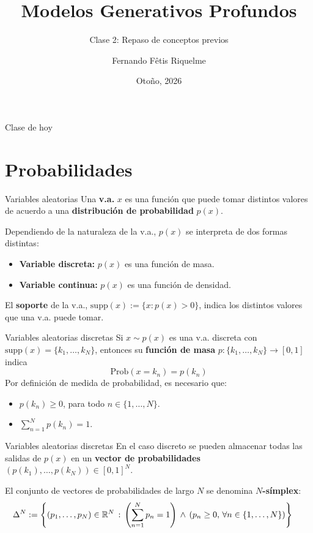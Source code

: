 \documentclass{beamer}
\title{Modelos Generativos Profundos}
\subtitle{Clase 2: Repaso de conceptos previos}
\author{Fernando Fêtis Riquelme}
\institute{
    Facultad de Ciencias Físicas y Matemáticas\\
    Universidad de Chile
}
\date{Otoño, 2026}
\newcommand{\R}{\mathbb{R}}
\begin{document}
\begin{frame}
    \titlepage
\end{frame}

\begin{frame}{Clase de hoy}
    \tableofcontents
\end{frame}

\section{Probabilidades}

\begin{frame}{Variables aleatorias}
    Una \textbf{v.a.} $x$ es una función que puede tomar distintos valores de acuerdo a una \textbf{distribución de probabilidad} $p(x)$.

    Dependiendo de la naturaleza de la v.a., $p(x)$ se interpreta de dos formas distintas:
    \begin{itemize}
        \item \textbf{Variable discreta:} $p(x)$ es una función de masa.
        \item \textbf{Variable continua:} $p(x)$ es una función de densidad.
    \end{itemize}
    El \textbf{soporte} de la v.a., $\text{supp}(x):=\{x:p(x)>0\}$, indica los distintos valores que una v.a. puede tomar.
\end{frame}

\begin{frame}{Variables aleatorias discretas}
    Si $x\sim p(x)$ es una v.a. discreta con $\text{supp}(x)=\{k_1,\ldots,k_N\}$, entonces su \textbf{función de masa} $p:\{k_1,\ldots,k_N\}\to[0,1]$ indica
    \begin{equation*}
        \text{Prob}(x=k_n)=p(k_n)
    \end{equation*}
    Por definición de medida de probabilidad, es necesario que:
    \begin{itemize}
        \item $p(k_n)\geq 0$, para todo $n\in\{1,\ldots,N\}$.
        \item $\sum_{n=1}^N p(k_n)=1$.
    \end{itemize}
\end{frame}

\begin{frame}{Variables aleatorias discretas}
    En el caso discreto se pueden almacenar todas las salidas de $p(x)$ en un \textbf{vector de probabilidades} $\left(p(k_1),\ldots,p(k_N)\right)\in[0,1]^N$.

    El conjunto de vectores de probabilidades de largo $N$ se denomina \textbf{$N$-símplex}:
    \begin{equation*}
        \hspace{-0.5cm}
        \Delta^N:=\left\{(p_1,\ldots,p_N)\in\R^N\,:\, \left(\sum_{n=1}^N p_n=1\right)\,\land\, \left(p_n\geq0,\,\forall n\in\{1,\ldots,N\}\right) \right\}
    \end{equation*}
\end{frame}
\end{document}
